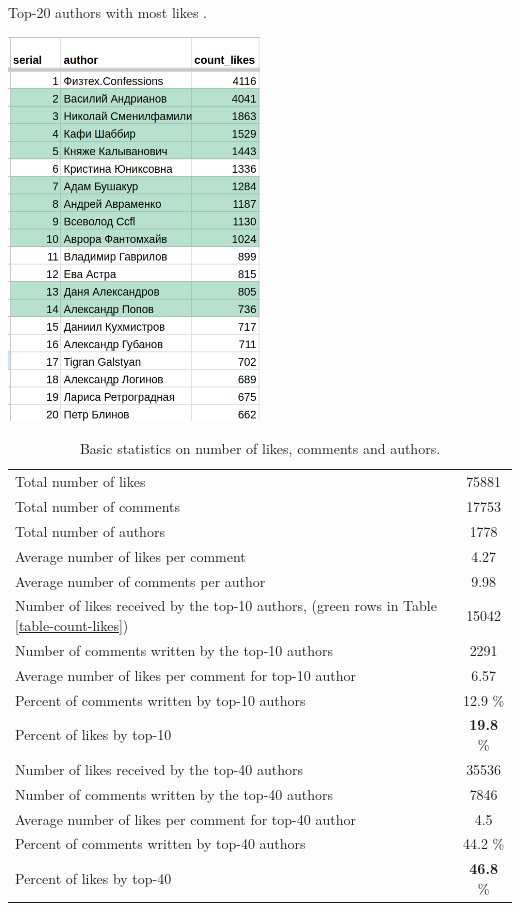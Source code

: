 \documentclass[
	11pt
] {article}
\begin{document}
	\begin{table}[H]
		\centering
		\caption{Top-20 authors with most likes \cite{sheet-count-likes}.}
		\label{table-count-likes}
		\includegraphics[width=0.5\textwidth]{table-count-likes-488}
	\end{table}

	\begin{table}[H]
		\centering
		\caption{Basic statistics on number of likes, comments and authors.}
		\label{table:basic-stats-number-likes-comments-author}
		\begin{tabular}{| p{5cm}  c |} %
			\hline
			Total number of likes & \num{75881} \\
			Total number of comments & \num{17753} \\
			Total number of authors & \num{1778} \\
			\hline
			Average number of likes per comment & \num{4.27} \\
			Average number of comments per author & \num{9.98} \\
			\hline
			Number of likes received by the top-10 authors, (green rows in Table \ref{table-count-likes}) & \num{15042} \\
			Number of comments written by the top-10 authors & \num{2291} \\
			Average number of likes per comment for top-10 author & \num{6.57} \\
			\hline
			Percent of comments written by top-10 authors & \num{12.9} \% \\
			Percent of likes by top-10 & \textbf{\num{19.8}} \% \\
			\hline
			\hline
			Number of likes received by the top-40 authors & \num{35536} \\
			Number of comments written by the top-40 authors & \num{7846} \\
			Average number of likes per comment for top-40 author & \num{4.5} \\
			\hline
			Percent of comments written by top-40 authors & \num{44.2} \% \\
			Percent of likes by top-40 & \textbf{\num{46.8}} \% \\
			\hline
		\end{tabular}
	\end{table}
\end{document}
